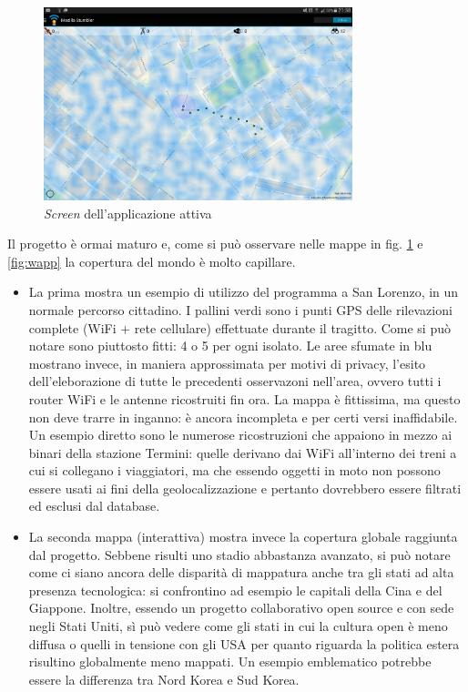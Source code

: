 \begin{figure}[ht!]
	\centering
	\includegraphics[width=0.8\textwidth]{./Immagini/Dati/appmap.jpg}
	\caption{\emph{Screen} dell'applicazione attiva}
	\label{fig:mapp}
\end{figure}
Il progetto è ormai maturo e, come si può osservare nelle mappe in fig. \ref{fig:mapp} e \ref{fig:wapp} la copertura del mondo è molto capillare.
\begin{itemize}
	\item La prima mostra un esempio di utilizzo del programma a San Lorenzo, in un normale percorso cittadino. I pallini verdi sono i punti GPS delle rilevazioni complete (WiFi + rete cellulare) effettuate durante il tragitto. Come si può notare sono piuttosto fitti: 4 o 5 per ogni isolato. Le aree sfumate in blu mostrano invece, in maniera approssimata per motivi di privacy, l'esito dell'eleborazione di tutte le precedenti osservazoni nell'area, ovvero tutti i router WiFi e le antenne ricostruiti fin ora. La mappa è fittissima, ma questo non deve trarre in inganno: è ancora incompleta e per certi versi inaffidabile. Un esempio diretto sono le numerose ricostruzioni che appaiono in mezzo ai binari della stazione Termini: quelle derivano dai WiFi all'interno dei treni a cui si collegano i viaggiatori, ma che essendo oggetti in moto non possono essere usati ai fini della geolocalizzazione e pertanto dovrebbero essere filtrati ed esclusi dal database.
	\item La seconda mappa (interattiva) mostra invece la copertura globale raggiunta dal progetto. Sebbene risulti uno stadio abbastanza avanzato, si può notare come ci siano ancora delle disparità di mappatura anche tra gli stati ad alta presenza tecnologica: si confrontino ad esempio le capitali della Cina e del Giappone. Inoltre, essendo un progetto collaborativo open source e con sede negli Stati Uniti, sì può vedere come gli stati in cui la cultura open è meno diffusa o quelli in tensione con gli USA per quanto riguarda la politica estera risultino globalmente meno mappati. Un esempio emblematico potrebbe essere la differenza tra Nord Korea e Sud Korea.
\end{itemize}

